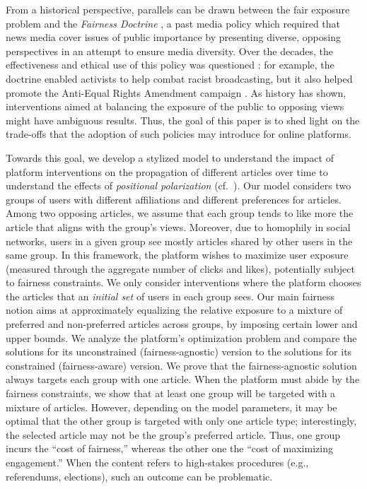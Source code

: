 \documentclass[letterpaper]{article} %
\begin{document}
From a historical perspective, parallels can be drawn between the fair exposure problem and the \textit{Fairness Doctrine} \citep{NYT_FairnessDoctrine_2021, WP_FairnessDoctrine_2021}, a past media policy which required that news media cover issues of public importance by presenting diverse, opposing perspectives in an attempt to ensure media diversity.
Over the decades, the effectiveness and ethical use of this policy was questioned \citep{WP_FairnessDoctrine_2021}: for example, the doctrine enabled activists to help combat racist broadcasting, but it also helped promote the Anti-Equal Rights Amendment campaign \citep{WP_FairnessDoctrine_2021}.
As  history has shown, interventions aimed at balancing the exposure of the public to opposing views might have ambiguous results.
Thus, the goal of this paper is to shed light on the trade-offs that the adoption of such policies may introduce for online platforms.

Towards this goal, we develop a stylized model to understand the impact of platform interventions on the propagation of different articles over time to understand the effects of \emph{positional polarization} (cf.~\citet{Yarchi2020PoliticalPO}).
Our model considers two groups of users with different affiliations and different preferences for articles.
Among two opposing articles, we assume that each group tends to like more the article that aligns with the group's views.
Moreover, due to homophily in social networks, users in a given group see mostly articles shared by other users in the same group.
In this framework, the platform wishes to maximize user exposure (measured through the aggregate number of clicks and likes), potentially subject to fairness constraints.
We only consider interventions where the platform chooses the articles that an \emph{initial set} of users in each group sees.
Our main fairness notion aims at approximately equalizing the relative exposure to a mixture of preferred and non-preferred articles across groups, by imposing certain lower and upper bounds.
We analyze the platform's optimization problem and compare the solutions for its unconstrained (fairness-agnostic) version to the solutions for its constrained (fairness-aware) version.
We prove that the fairness-agnostic solution always targets each group with one article.
When the platform must abide by the fairness constraints, we show that at least one group will be targeted with a mixture of articles.
However, depending on the model parameters, it may be optimal that the other group is targeted with only one article type; interestingly, the selected article may not be the group's preferred article. Thus, one group incurs the ``cost of fairness,'' whereas the other one the ``cost of maximizing engagement.'' When the content refers to high-stakes procedures (e.g., referendums, elections), such an outcome can be problematic.
\end{document}

